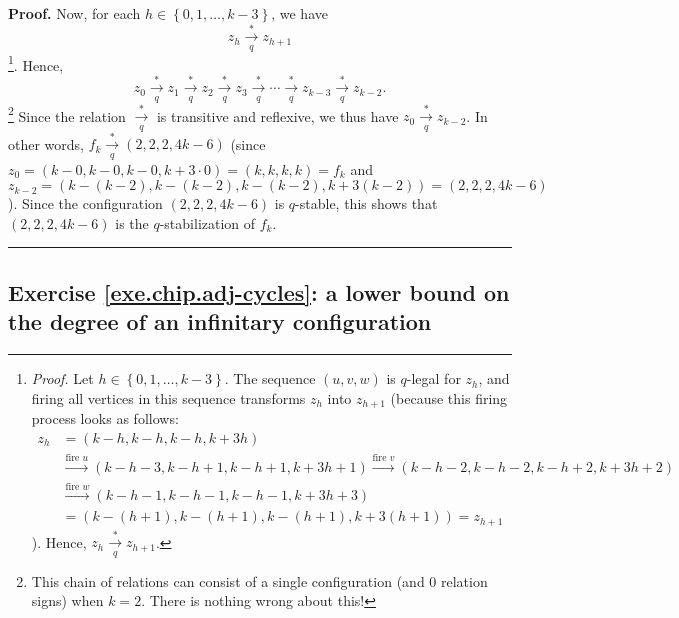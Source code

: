 \documentclass[numbers=enddot,12pt,final,onecolumn,notitlepage]{scrartcl}%
\theoremstyle{definition}
\newenvironment{proof}[1][Proof]{\noindent\textbf{#1.} }{\ \rule{0.5em}{0.5em}}
\begin{document}
\begin{proof}
Now, for each $h\in\left\{  0,1,\ldots,k-3\right\}  $, we have%
\[
z_{h}\underset{q}{\overset{\ast}{\rightarrow}}z_{h+1}%
\]
\footnote{\textit{Proof.} Let $h\in\left\{  0,1,\ldots,k-3\right\}  $. The
sequence $\left(  u,v,w\right)  $ is $q$-legal for $z_{h}$, and firing all
vertices in this sequence transforms $z_{h}$ into $z_{h+1}$ (because this
firing process looks as follows:%
\begin{align*}
z_{h}  &  =\left(  k-h,k-h,k-h,k+3h\right) \\
&  \overset{\text{fire }u}{\longrightarrow}\left(
k-h-3,k-h+1,k-h+1,k+3h+1\right)  \overset{\text{fire }v}{\longrightarrow
}\left(  k-h-2,k-h-2,k-h+2,k+3h+2\right) \\
&  \overset{\text{fire }w}{\longrightarrow}\left(
k-h-1,k-h-1,k-h-1,k+3h+3\right) \\
&  =\left(  k-\left(  h+1\right)  ,k-\left(  h+1\right)  ,k-\left(
h+1\right)  ,k+3\left(  h+1\right)  \right)  =z_{h+1}%
\end{align*}
). Hence, $z_{h}\underset{q}{\overset{\ast}{\rightarrow}}z_{h+1}$.}. Hence,%
\[
z_{0}\underset{q}{\overset{\ast}{\rightarrow}}z_{1}\underset{q}{\overset{\ast
}{\rightarrow}}z_{2}\underset{q}{\overset{\ast}{\rightarrow}}z_{3}%
\underset{q}{\overset{\ast}{\rightarrow}}\cdots\underset{q}{\overset{\ast
}{\rightarrow}}z_{k-3}\underset{q}{\overset{\ast}{\rightarrow}}z_{k-2}.
\]
\footnote{This chain of relations can consist of a single configuration (and
$0$ relation signs) when $k=2$. There is nothing wrong about this!} Since the
relation $\underset{q}{\overset{\ast}{\rightarrow}}$ is transitive and
reflexive, we thus have $z_{0}\underset{q}{\overset{\ast}{\rightarrow}}%
z_{k-2}$. In other words, $f_{k}\underset{q}{\overset{\ast}{\rightarrow}%
}\left(  2,2,2,4k-6\right)  $ (since $z_{0}=\left(  k-0,k-0,k-0,k+3\cdot
0\right)  =\left(  k,k,k,k\right)  =f_{k}$ and $z_{k-2}=\left(  k-\left(
k-2\right)  ,k-\left(  k-2\right)  ,k-\left(  k-2\right)  ,k+3\left(
k-2\right)  \right)  =\left(  2,2,2,4k-6\right)  $). Since the configuration
$\left(  2,2,2,4k-6\right)  $ is $q$-stable, this shows that $\left(
2,2,2,4k-6\right)  $ is the $q$-stabilization of $f_{k}$.
\end{proof}

\subsection{Exercise \ref{exe.chip.adj-cycles}: a lower bound
on the degree of an infinitary configuration}
\end{document}
